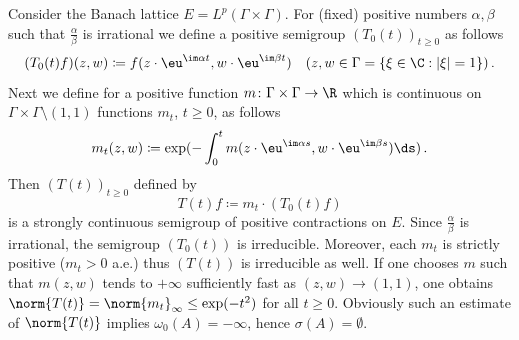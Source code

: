 \begin{example}\label{ex:c3-3.6}

Consider the Banach lattice $E = L^{p}(\Gamma\times\Gamma)$.
For (fixed) positive numbers $\alpha,\beta$ such that $\frac{\alpha}{\beta}$ is irrational we define a positive semigroup $(T_{0}(t))_{t\geq 0}$ as follows
\begin{equation}\label{eq:c3-3.9}
	(T_{0}(t)f)(z,w) \coloneqq f(z\cdot \eu^{\im\alpha t},w\cdot \eu^{\im\beta t}) \quad (z,w \in \Gamma = \{\xi\in\C :|\xi|=1\})\,.
\end{equation}
Next we define for a positive function $m \colon \Gamma\times\Gamma \to \R $ which is continuous on $\Gamma\times\Gamma\setminus(1,1)$ functions $m_{t}$, $t\geq 0$, as follows
\begin{equation}\label{eq:c3-3.10}
	m_{t}(z,w) \coloneqq \exp(-\int_{0}^{t} m(z\cdot \eu^{\im\alpha s},w\cdot \eu^{\im\beta s})\ds )\,.
\end{equation}
Then $(T(t))_{t\geq 0}$ defined by
\begin{equation}\label{eq:c3-3.11}
	T(t)f \coloneqq m_{t}\cdot(T_{0}(t)f)
\end{equation}
is a strongly continuous semigroup of positive contractions on $E$.
Since $\frac{\alpha}{\beta}$ is irrational, the semigroup $(T_{0}(t))$ is irreducible.
Moreover, each $m_{t}$ is strictly positive (\ie  $m_{t} > 0$ a.e.) thus $(T(t))$ is irreducible as well.
If one chooses $m$ such that $m(z,w)$ tends to $+\infty$ sufficiently fast as $(z,w) \to (1,1)$, one obtains $\norm{T(t)} = \norm{m_{t}}_{\infty} \leq \exp(-t^{2})$ for all $t \geq 0$.
Obviously such an estimate of\/ $\norm{T(t)}$ implies $\omega_0(A) = -\infty$, hence $\sigma(A) = \emptyset$.
\end{example}
